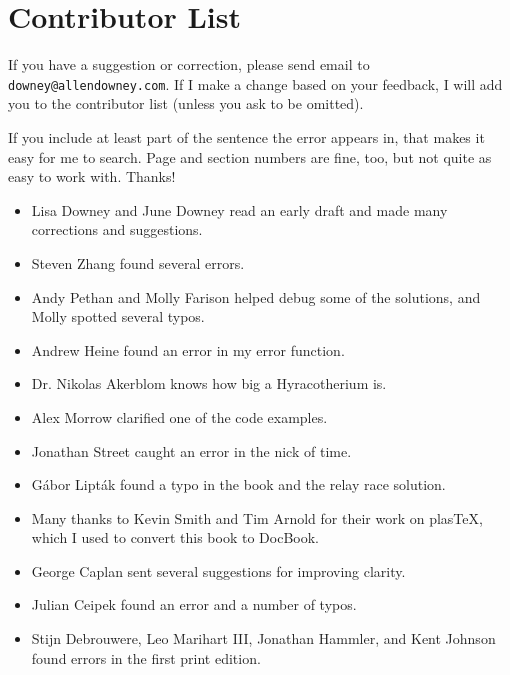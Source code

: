 \documentclass[12pt]{book}
\begin{document}
\section*{Contributor List}

If you have a suggestion or correction, please send email to 
{\tt downey@allendowney.com}.  If I make a change based on your
feedback, I will add you to the contributor list
(unless you ask to be omitted).

If you include at least part of the sentence the
error appears in, that makes it easy for me to search.  Page and
section numbers are fine, too, but not quite as easy to work with.
Thanks!

\small

\begin{itemize}

\item Lisa Downey and June Downey read an early draft and made many
corrections and suggestions.

\item Steven Zhang found several errors.

\item Andy Pethan and Molly Farison helped debug some of the solutions,
and Molly spotted several typos.

\item Andrew Heine found an error in my error function.

\item Dr. Nikolas Akerblom knows how big a Hyracotherium is.

\item Alex Morrow clarified one of the code examples.

\item Jonathan Street caught an error in the nick of time.

\item G\'{a}bor Lipt\'{a}k found a typo in the book and the relay race solution.

\item Many thanks to Kevin Smith and Tim Arnold for their work on
plasTeX, which I used to convert this book to DocBook.

\item George Caplan sent several suggestions for improving clarity.

\item Julian Ceipek found an error and a number of typos.

\item Stijn Debrouwere, Leo Marihart III, Jonathan Hammler, and Kent Johnson
found errors in the first print edition.


\end{itemize}
\end{document}
